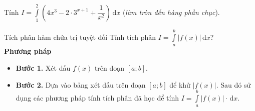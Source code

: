 \begin{ex}%
	Tính $I=\displaystyle\int\limits_1^2\left(4x^3-2\cdot3^{x+1}+\dfrac{1}{x^2} \right) \mathrm{\,d}x$ (\textit{làm tròn đến hàng phần chục}).
\end{ex}

\begin{dang}{Tích phân hàm chứa trị tuyệt đối}
	Tính tích phân $I=\displaystyle\int\limits_a^b|f(x)| \mathrm{\,d}x$?\\
	\textbf{Phương pháp}
	\begin{itemize}
		\item \textbf{Bước 1.} Xét dấu $f(x)$ trên đoạn $[a ; b]$.
		\item \textbf{Bước 2.} Dựa vào bảng xét dấu trên đoạn $[a ; b]$ để khử $|f(x)|$. Sau đó sử dụng các phương pháp tính tích phân đã học để tính $I=\displaystyle\int\limits_a^b|f(x)| \cdot \mathrm{\,d}x$.
	\end{itemize}
\end{dang}

